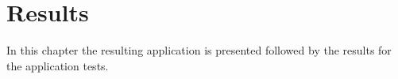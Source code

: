 \chapter{Results} \label{results}
In this chapter the resulting application is presented followed by the results for the application tests.


